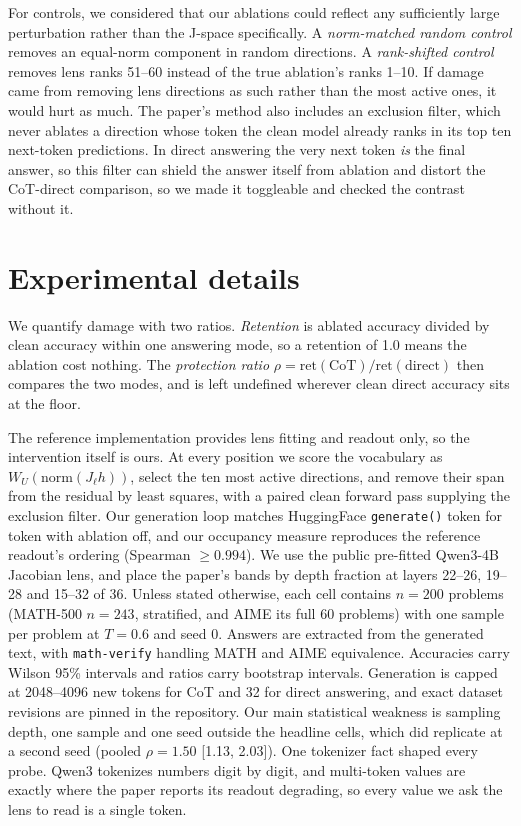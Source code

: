 \documentclass[10pt,a4paper]{article}
\begin{document}
For controls, we considered that our ablations could reflect any sufficiently large
perturbation rather than the J-space specifically. A \emph{norm-matched random control}
removes an equal-norm component in random directions. A \emph{rank-shifted control} removes lens ranks 51--60 instead of the true
ablation's ranks 1--10. If damage came from removing lens
directions as such rather than the most active ones, it would hurt as much. The paper's method also includes an exclusion filter, which never ablates a direction
whose token the clean model already ranks in its top ten next-token predictions. In
direct answering the very next token \emph{is} the final answer, so this filter can
shield the answer itself from ablation and distort the CoT-direct comparison, so we
made it toggleable and checked the contrast without it.

\section{Experimental details}
We quantify damage with two ratios. \emph{Retention} is ablated accuracy divided by
clean accuracy within one answering mode, so a retention of 1.0 means the ablation cost
nothing. The \emph{protection ratio}
$\rho=\mathrm{ret}(\text{CoT})/\mathrm{ret}(\text{direct})$ then compares the two modes,
and is left undefined wherever clean direct accuracy sits at the floor.

The reference implementation provides lens fitting and readout only, so the intervention
itself is ours. At every position we score the vocabulary as
$W_U(\mathrm{norm}(J_\ell h))$, select the ten most active directions, and remove their
span from the residual by least squares, with a paired clean forward pass supplying the
exclusion filter. Our generation loop matches HuggingFace \texttt{generate()} token for
token with ablation off, and our occupancy measure reproduces the reference readout's
ordering (Spearman $\geq0.994$). We use the public
pre-fitted Qwen3-4B Jacobian lens, and place the paper's bands by depth fraction at
layers 22--26, 19--28 and 15--32 of 36. Unless stated otherwise, each cell contains
$n{=}200$ problems (MATH-500 $n{=}243$,
stratified, and AIME its full 60 problems) with one sample per
problem at $T{=}0.6$ and seed 0. Answers are extracted from the generated text, with
\texttt{math-verify} handling MATH and AIME equivalence. Accuracies carry Wilson 95\%
intervals and ratios carry bootstrap intervals. Generation is capped at 2048--4096 new
tokens for CoT and 32 for direct answering, and exact dataset revisions are pinned in
the repository. Our main statistical weakness is sampling depth, one sample and one seed
outside the headline cells, which did replicate at a second seed (pooled $\rho=1.50$
[1.13, 2.03]). One tokenizer fact shaped every probe. Qwen3 tokenizes numbers digit by
digit, and multi-token values are exactly where the paper reports its readout degrading,
so every value we ask the lens to read is a single token. 
\end{document}
